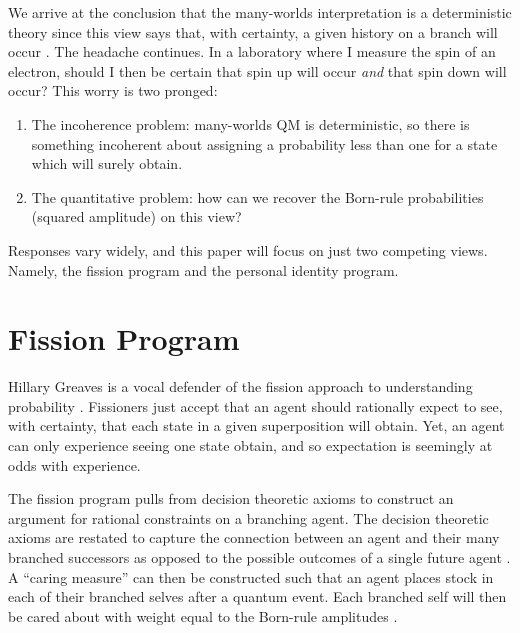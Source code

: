 \documentclass{article}
\begin{document}
We arrive at the conclusion that the many-worlds interpretation is a deterministic theory since this view says that, with certainty, a given history on a branch will occur \parencite{albertProbabilityEverettPicture2010}. The headache continues. In a laboratory where I measure the spin of an electron, should I then be certain that spin up will occur \emph{and} that spin down will occur? This worry is two pronged:
\begin{enumerate}
\item The incoherence problem: many-worlds QM is deterministic, so there is something incoherent about assigning a probability less than one for a state which will surely obtain.
\item The quantitative problem: how can we recover the Born-rule probabilities (squared amplitude) on this view?
\end{enumerate}
Responses vary widely, and this paper will focus on just two competing views. Namely, the fission program and the personal identity program.

\section{Fission Program}

Hillary Greaves is a vocal defender of the fission approach to understanding probability \parencite{greavesEverettEvidence2010, greavesProbabilityEverettInterpretation2007, greavesUnderstandingDeutschsProbability2004}. Fissioners just accept that an agent should rationally expect to see, with certainty, that each state in a given superposition will obtain. Yet, an agent can only experience seeing one state obtain, and so expectation is seemingly at odds with experience.

The fission program pulls from decision theoretic axioms to construct an argument for rational constraints on a branching agent. The decision theoretic axioms are restated to capture the connection between an agent and their many branched successors as opposed to the possible outcomes of a single future agent \parencite[18]{wallaceEpistemologyQuantizedCircumstances2006}. A ``caring measure'' can then be constructed such that an agent places stock in each of their branched selves after a quantum event. Each branched self will then be cared about with weight equal to the Born-rule amplitudes \parencite[sec. 3.1.2]{greavesProbabilityEverettInterpretation2007}. 
\end{document}

